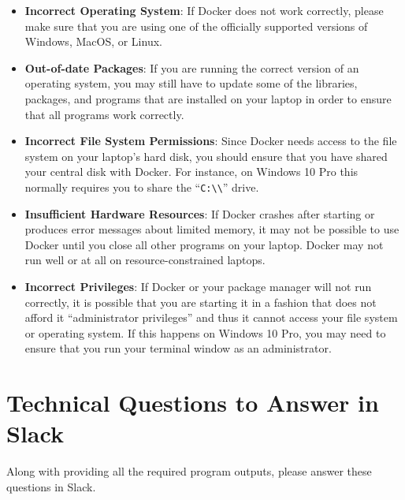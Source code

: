 \documentclass[11pt]{article}
\newcommand{\command}[1]{``\lstinline{#1}''}
\begin{document}
\begin{itemize}

\setlength{\itemsep}{0in}

  \item {\bf Incorrect Operating System}: If Docker does not work correctly,
    please make sure that you are using one of the officially supported versions
    of Windows, MacOS, or Linux.

  \item {\bf Out-of-date Packages}: If you are running the correct version of an
    operating system, you may still have to update some of the libraries,
    packages, and programs that are installed on your laptop in order to ensure
    that all programs work correctly.

  \item {\bf Incorrect File System Permissions}: Since Docker needs access to
    the file system on your laptop's hard disk, you should ensure that you have
    shared your central disk with Docker. For instance, on Windows 10 Pro this
    normally requires you to share the \command{C:\\} drive.

  \item {\bf Insufficient Hardware Resources}: If Docker crashes after starting
    or produces error messages about limited memory, it may not be possible to
    use Docker until you close all other programs on your laptop. Docker may not
    run well or at all on resource-constrained laptops.

  \item {\bf Incorrect Privileges}: If Docker or your package manager will not
    run correctly, it is possible that you are starting it in a fashion that
    does not afford it ``administrator privileges'' and thus it cannot access
    your file system or operating system. If this happens on Windows 10 Pro, you
    may need to ensure that you run your terminal window as an administrator.

\end{itemize}

\vspace*{-.1in}

\section*{Technical Questions to Answer in Slack}

\noindent Along with providing all the required program outputs, please answer
these questions in Slack.
\end{document}
